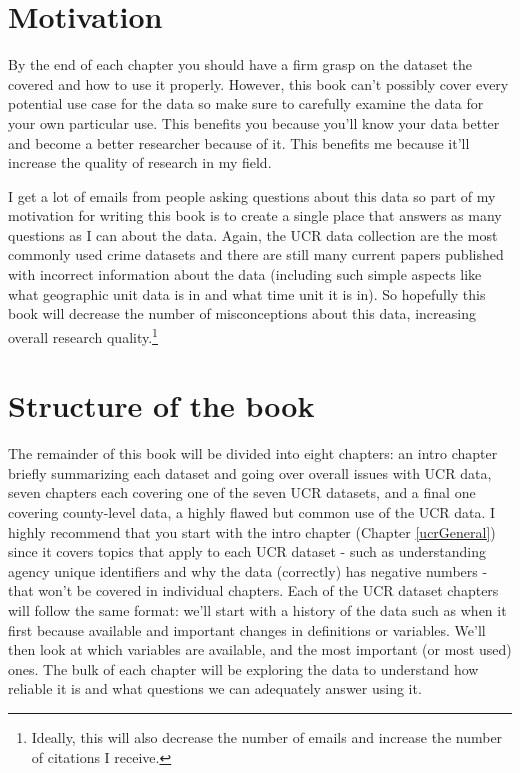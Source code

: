 \documentclass[
  12pt,
  openany]{book}
\begin{document}
\hypertarget{motivation}{%
\section{Motivation}\label{motivation}}

By the end of each chapter you should have a firm grasp on the dataset the covered and how to use it properly. However, this book can't possibly cover every potential use case for the data so make sure to carefully examine the data for your own particular use. This benefits you because you'll know your data better and become a better researcher because of it. This benefits me because it'll increase the quality of research in my field.

I get a lot of emails from people asking questions about this data so part of my motivation for writing this book is to create a single place that answers as many questions as I can about the data. Again, the UCR data collection are the most commonly used crime datasets and there are still many current papers published with incorrect information about the data (including such simple aspects like what geographic unit data is in and what time unit it is in). So hopefully this book will decrease the number of misconceptions about this data, increasing overall research quality.\footnote{Ideally, this will also decrease the number of emails and increase the number of citations I receive.}

\hypertarget{structure-of-the-book}{%
\section{Structure of the book}\label{structure-of-the-book}}

The remainder of this book will be divided into eight chapters: an intro chapter briefly summarizing each dataset and going over overall issues with UCR data, seven chapters each covering one of the seven UCR datasets, and a final one covering county-level data, a highly flawed but common use of the UCR data. I highly recommend that you start with the intro chapter (Chapter \ref{ucrGeneral}) since it covers topics that apply to each UCR dataset - such as understanding agency unique identifiers and why the data (correctly) has negative numbers - that won't be covered in individual chapters. Each of the UCR dataset chapters will follow the same format: we'll start with a history of the data such as when it first because available and important changes in definitions or variables. We'll then look at which variables are available, and the most important (or most used) ones. The bulk of each chapter will be exploring the data to understand how reliable it is and what questions we can adequately answer using it.
\end{document}

